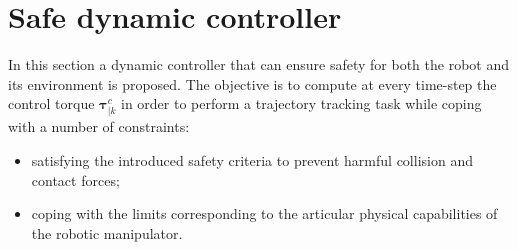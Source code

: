 \section{Safe dynamic controller}
\label{sec:safe_controller}
In this section a dynamic controller that can ensure safety for both the robot and its environment is proposed. The objective is to compute at every time-step the control torque $\boldsymbol{\tau}_{|k}^{c}$ in order to perform a trajectory tracking task while coping with a number of constraints: 
\begin{itemize}
\item satisfying the introduced safety criteria to prevent harmful collision and contact forces; 
\item coping with the limits corresponding to the articular physical capabilities of the robotic manipulator.
\end{itemize}

